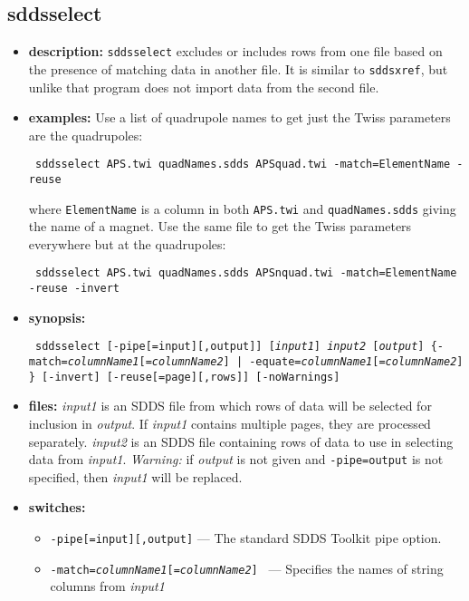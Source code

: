 \newpage
\subsection{sddsselect}
\label{sddsselect}

\begin{itemize}
\item {\bf description:}
{\tt sddsselect} excludes or includes rows from one file based on the presence of matching data in another
file.  It is similar to {\tt sddsxref}, but unlike that program does not import data from the second file.
\item {\bf examples:} 
Use a list of quadrupole names to get just the Twiss parameters are the quadrupoles:
\begin{flushleft}{\tt
sddsselect APS.twi quadNames.sdds APSquad.twi -match=ElementName -reuse
}\end{flushleft}
where {\tt ElementName} is a column in both {\tt APS.twi} and {\tt quadNames.sdds} giving the
name of a magnet.
Use the same file to get the Twiss parameters everywhere but at the quadrupoles:
\begin{flushleft}{\tt
sddsselect APS.twi quadNames.sdds APSnquad.twi -match=ElementName -reuse -invert
}\end{flushleft}
\item {\bf synopsis:} 
\begin{flushleft}{\tt
sddsselect [-pipe[=input][,output]] [{\em input1}] {\em input2} [{\em output}] 
\{-match={\em columnName1}[={\em columnName2}] |
 -equate={\em columnName1}[={\em columnName2}] \}
[-invert] [-reuse[=page][,rows]] [-noWarnings]
}
\end{flushleft}
\item {\bf files:}
{\em input1} is an SDDS file from which rows of data will be selected for inclusion in {\em output}.  
If {\em input1} contains multiple pages, they are processed separately. {\em input2} is an SDDS
file containing rows of data to use in selecting data from {\em input1}.  {\em Warning:} if {\em output} is not given and
{\tt -pipe=output} is not specified, then {\em input1} will be replaced.
\item {\bf switches:}
    \begin{itemize}
    \item {\tt -pipe[=input][,output]} --- The standard SDDS Toolkit pipe option.
    \item {\tt -match={\em columnName1}[={\em columnName2}] } --- Specifies the names of string columns from {\em input1}

\end{itemize}
\end{itemize}
